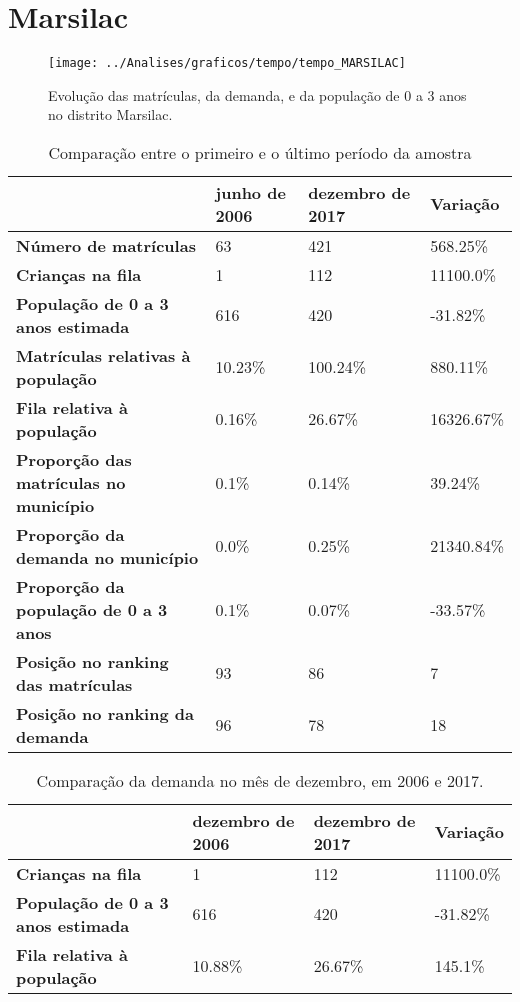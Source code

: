 \section{Marsilac}
\begin{figure}[H]
\centering
\texttt{[image: ../Analises/graficos/tempo/tempo\_MARSILAC]}
\caption{Evolução das matrículas, da demanda, e da população de 0 a 3 anos no distrito Marsilac.}
\end{figure}
\begin{table}[H]
\begin{tabular}{|l|l|l|l|}
\hline
\textbf{}                                      & \textbf{junho de 2006}       & \textbf{dezembro de 2017}    & \textbf{Variação} \\ \hline
\textbf{Número de matrículas}                  & 63 & 421 & 568.25\% \\ \hline
\textbf{Crianças na fila}                      & 1 & 112 & 11100.0\% \\ \hline
\textbf{População de 0 a 3 anos estimada}      & 616 & 420 & -31.82\% \\ \hline
\textbf{Matrículas relativas à população}      & 10.23\% & 100.24\% & 880.11\% \\ \hline
\textbf{Fila relativa à população}             & 0.16\% & 26.67\% & 16326.67\% \\ \hline
\textbf{Proporção das matrículas no município} & 0.1\% & 0.14\% & 39.24\% \\ \hline
\textbf{Proporção da demanda no município}     & 0.0\% & 0.25\% & 21340.84\% \\ \hline
\textbf{Proporção da população de 0 a 3 anos}  & 0.1\% & 0.07\% & -33.57\% \\ \hline
\textbf{Posição no ranking das matrículas}     & 93 & 86 & 7 \\ \hline
\textbf{Posição no ranking da demanda}         & 96 & 78 & 18 \\ \hline
\end{tabular}
\caption{Comparação entre o primeiro e o último período da amostra}
\end{table}
\begin{table}[H]
\begin{tabular}{|l|l|l|l|}
\hline
\textbf{}                                 & \textbf{dezembro de 2006} & \textbf{dezembro de 2017} & \textbf{Variação} \\ \hline
\textbf{Crianças na fila}                      & 1 & 112 & 11100.0\% \\ \hline
\textbf{População de 0 a 3 anos estimada}      & 616 & 420 & -31.82\% \\ \hline
\textbf{Fila relativa à população}             & 10.88\% & 26.67\% & 145.1\% \\ \hline
\end{tabular}
\caption{Comparação da demanda no mês de dezembro, em 2006 e 2017.}
\end{table}
